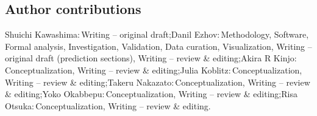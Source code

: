 \documentclass[10pt,a4paper,onecolumn]{article}
\begin{document}
\makeatletter
\newcommand{\authorcontribheading}{%
  \subsection*{Author contributions}%
  \global\let\authorcontribheading\@empty
  \global\def\authorcontribend{.}%
}
\newcommand{\authorcontribsep}{\global\def\authorcontribsep{;\space}}
\newcommand{\authorcontribend}{}
\makeatother
\authorcontribheading\authorcontribsep Shuichi Kawashima:\,Writing --
original draft\authorcontribheading\authorcontribsep Danil
Ezhov:\,Methodology, Software, Formal analysis, Investigation,
Validation, Data curation, Visualization, Writing -- original draft
(prediction sections), Writing -- review \&
editing\authorcontribheading\authorcontribsep Akira R
Kinjo:\,Conceptualization, Writing -- review \&
editing\authorcontribheading\authorcontribsep Julia
Koblitz:\,Conceptualization, Writing -- review \&
editing\authorcontribheading\authorcontribsep Takeru
Nakazato:\,Conceptualization, Writing -- review \&
editing\authorcontribheading\authorcontribsep Yoko
Okabbepu:\,Conceptualization, Writing -- review \&
editing\authorcontribheading\authorcontribsep Risa
Otsuka:\,Conceptualization, Writing -- review \&
editing\authorcontribend

\printbibliography
\end{document}
